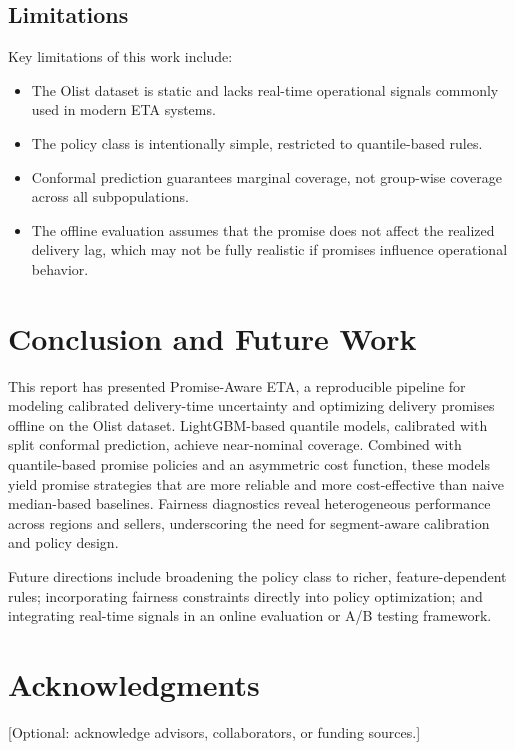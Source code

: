 \documentclass[10pt,twocolumn]{article}
\begin{document}
\subsection{Limitations}
Key limitations of this work include:
\begin{itemize}
  \item The Olist dataset is static and lacks real-time operational signals commonly used in modern ETA systems.
  \item The policy class is intentionally simple, restricted to quantile-based rules.
  \item Conformal prediction guarantees marginal coverage, not group-wise coverage across all subpopulations.
  \item The offline evaluation assumes that the promise does not affect the realized delivery lag, which may not be fully realistic if promises influence operational behavior.
\end{itemize}

\section{Conclusion and Future Work}
This report has presented Promise-Aware ETA, a reproducible pipeline for modeling calibrated delivery-time uncertainty and optimizing delivery promises offline on the Olist dataset. LightGBM-based quantile models, calibrated with split conformal prediction, achieve near-nominal coverage. Combined with quantile-based promise policies and an asymmetric cost function, these models yield promise strategies that are more reliable and more cost-effective than naive median-based baselines. Fairness diagnostics reveal heterogeneous performance across regions and sellers, underscoring the need for segment-aware calibration and policy design.

Future directions include broadening the policy class to richer, feature-dependent rules; incorporating fairness constraints directly into policy optimization; and integrating real-time signals in an online evaluation or A/B testing framework.

\section*{Acknowledgments}
[Optional: acknowledge advisors, collaborators, or funding sources.]
\end{document}
